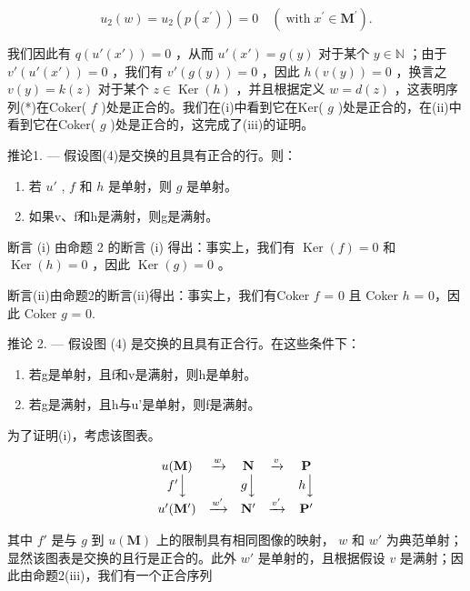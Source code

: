 \[
u _ {2} (w) = u _ {2} \left(p \left(x ^ {\prime}\right)\right) = 0 \quad \left(\operatorname{with} x ^ {\prime} \in \mathbf {M} ^ {\prime}\right).
\]

我们因此有 \(q(u'(x')) = 0\) ，从而 \(u'(x') = g(y)\) 对于某个 \(y \in \mathbb{N}\) ；由于 \(v'(u'(x')) = 0\) ，我们有 \(v'(g(y)) = 0\) ，因此 \(h(v(y)) = 0\) ，换言之 \(v(y) = k(z)\) 对于某个 \(z \in \operatorname{Ker}(h)\) ，并且根据定义 \(w = d(z)\) ，这表明序列(*)在Coker( \(f\) )处是正合的。我们在(i)中看到它在Ker( \(g\) )处是正合的，在(ii)中看到它在Coker( \(g\) )处是正合的，这完成了(iii)的证明。

推论1. --- 假设图(4)是交换的且具有正合的行。则：

\begin{enumerate}
\def\labelenumi{(\roman{enumi})}
\item
  若 \(u'\) , \(f\) 和 \(h\) 是单射，则 \(g\) 是单射。
\item
  如果v、f和h是满射，则g是满射。
\end{enumerate}

断言 (i) 由命题 2 的断言 (i) 得出：事实上，我们有 \(\operatorname{Ker}(f) = 0\) 和 \(\operatorname{Ker}(h) = 0\) ，因此 \(\operatorname{Ker}(g) = 0\) 。

断言(ii)由命题2的断言(ii)得出：事实上，我们有Coker \(f\) = 0 且 Coker \(h\) = 0，因此 Coker \(g\) = 0.

推论 2. --- 假设图 (4) 是交换的且具有正合行。在这些条件下：

\begin{enumerate}
\def\labelenumi{(\roman{enumi})}
\item
  若g是单射，且f和v是满射，则h是单射。
\item
  若g是满射，且h与u'是单射，则f是满射。
\end{enumerate}

为了证明(i)，考虑该图表。

\[
\begin{array}{c c c c c} u (\mathbf {M}) & \xrightarrow {w} & \mathbf {N} & \xrightarrow {v} & \mathbf {P} \\ f ^ {\prime} \Big \downarrow & & g \Big \downarrow & & h \Big \downarrow \\ u ^ {\prime} (\mathbf {M} ^ {\prime}) & \xrightarrow {w ^ {\prime}} & \mathbf {N} ^ {\prime} & \xrightarrow {v ^ {\prime}} & \mathbf {P} ^ {\prime} \end{array}
\]

其中 \(f'\) 是与 \(g\) 到 \(u(\mathbf{M})\) 上的限制具有相同图像的映射， \(w\) 和 \(w'\) 为典范单射；显然该图表是交换的且行是正合的。此外 \(w'\) 是单射的，且根据假设 \(v\) 是满射；因此由命题2(iii)，我们有一个正合序列

